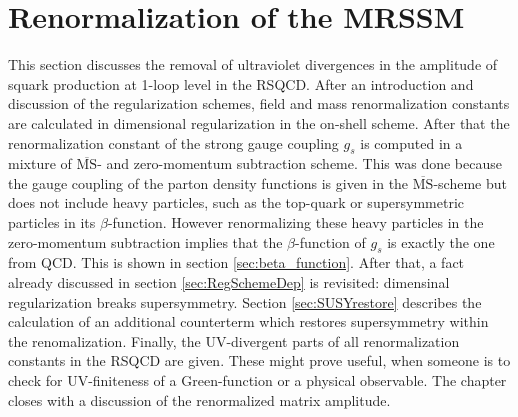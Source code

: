 \section{Renormalization of the MRSSM}\label{sec:renMRSSM}
This section discusses the removal of ultraviolet divergences in the amplitude of squark production at 1-loop level in the RSQCD. After an introduction and discussion of the regularization schemes, field and mass renormalization constants are calculated in dimensional regularization in the on-shell scheme. After that the renormalization constant of the strong gauge coupling $g_s$ is computed in a mixture of $\overline{\mathrm{MS}}$- and zero-momentum subtraction scheme. This was done because the gauge coupling of the parton density functions is given in the $\overline{\mathrm{MS}}$-scheme but does not include heavy particles, such as the top-quark or supersymmetric particles in its $\beta$-function. However renormalizing these heavy particles in the zero-momentum subtraction implies that the $\beta$-function of $g_s$ is exactly the one from QCD. This is shown in section \ref{sec:beta_function}. After that, a fact already discussed in section \ref{sec:RegSchemeDep} is revisited: dimensinal regularization breaks supersymmetry. Section \ref{sec:SUSYrestore} describes the calculation of an additional counterterm which restores supersymmetry within the renomalization. Finally, the UV-divergent parts of all renormalization constants in the RSQCD are given. These might prove useful, when someone is to check for UV-finiteness of a Green-function or a physical observable. The chapter closes with a discussion of the renormalized matrix amplitude.

